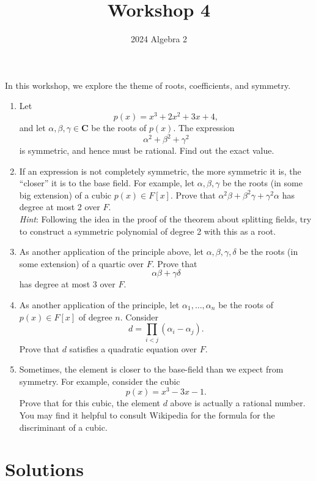 \documentclass[12pt]{amsart}
\author{2024 Algebra 2}
\date{}
\title{Workshop 4}
\begin{document}
\maketitle
In this workshop, we explore the theme of roots, coefficients, and symmetry.

\begin{enumerate}
\item Let
\[ p(x) = x^3 + 2x^2 + 3x + 4,\]
and let \(\alpha, \beta, \gamma \in \mathbf{C}\) be the roots of \(p(x)\).
The expression
\[ \alpha^2 + \beta^2 + \gamma^{2}\]
is symmetric, and hence must be rational.
Find out the exact value.

\item If an expression is not completely symmetric, the more symmetric it is, the ``closer'' it is to the base field.
For example, let \(\alpha, \beta, \gamma\) be the roots (in some big extension) of a cubic \(p(x) \in F[x]\).
Prove that \(\alpha^2 \beta + \beta^2 \gamma + \gamma^2\alpha\) has degree at most 2 over \(F\).\\
\emph{Hint}: Following the idea in the proof of the theorem about splitting fields, try to construct a symmetric polynomial of degree 2 with this as a root.

\item As another application of the principle above, let \(\alpha, \beta, \gamma, \delta\) be the roots (in some extension) of a quartic over \(F\).
Prove that
\[ \alpha\beta + \gamma\delta\]
has degree at most 3 over \(F\).

\item As another application of the principle, let \(\alpha_1, \dots, \alpha_n\) be the roots of \(p(x) \in F[x]\) of degree \(n\).
Consider
\[ d = \prod_{i < j}(\alpha_i - \alpha_j).\]
Prove that \(d\) satisfies a quadratic equation over \(F\).

\item Sometimes, the element is closer to the base-field than we expect from symmetry.
For example, consider the cubic
\[ p(x) = x^3-3x-1.\]
Prove that for this cubic, the element \(d\) above is actually a rational number.
You may find it helpful to consult Wikipedia for the formula for the discriminant of a cubic.
\end{enumerate}
\section{Solutions}
\label{sec:org647b5cd}
\end{document}
